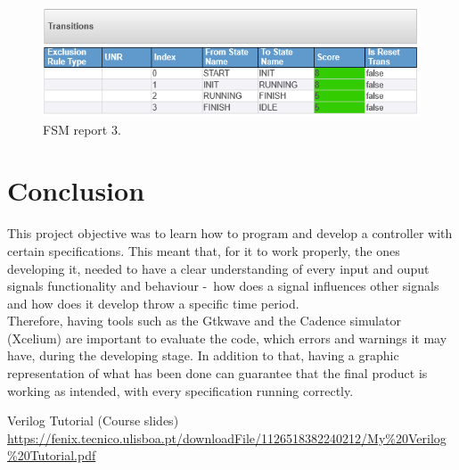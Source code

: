 \documentclass[12pt]{article}
\begin{document}
    \begin{figure}[H]
        \centering
        \includegraphics[scale=0.7]{FSM_report3.png}
            \caption{FSM report 3.}
            \label{fig:FSMreport3}
    \end{figure}
    
    
    
 \newpage   
	
	\section{Conclusion}
	This project objective was to learn how to program and develop a controller with certain \mbox{specifications}. This meant that, for it to work properly, the ones developing it, needed to have a clear understanding of every input and ouput signals functionality and behaviour \mbox{- how} does a signal influences other signals and how does it develop throw a specific time period.\\ 
	Therefore, having tools such as the Gtkwave and the Cadence simulator (Xcelium) are important to evaluate the code, which errors and warnings it may have, during the developing stage. In addition to that, having a graphic representation of what has been done can guarantee that the final product is working as intended, with every specification running correctly.

	\begin{thebibliography}{20}
Verilog Tutorial (Course slides)\\
\url{https://fenix.tecnico.ulisboa.pt/downloadFile/1126518382240212/My%20Verilog%20Tutorial.pdf}

\end{thebibliography}
\end{document}
